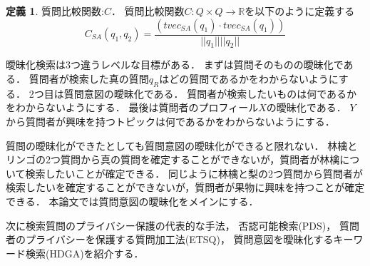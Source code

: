 \documentclass[master]{suribt}
\theoremstyle{definition}
\newtheorem{defi}[thm]{定義}
\begin{document}
 \begin{defi}{質問比較関数:$C$．}
  質問比較関数$C:Q \times Q \rightarrow \mathbb{R}$を以下のように定義する
  \begin{equation}
  C_{SA}(q_1,q_2) = \frac{(tvec_{SA}(q_1) \cdot tvec_{SA}(q_1))}{||q_1|| ||q_2||}
  \end{equation}
 \end{defi}
 
 
 曖昧化検索は3つ違うレベルな目標がある．
 まずは質問そのものの曖昧化である．
 質問者が検索した真の質問$q_R$はどの質問であるかをわからないようにする．
 2つ目は質問意図の曖昧化である．
 質問者が検索したいものは何であるかをわからないようにする．
 最後は質問者のプロフィール$X$の曖昧化である．
 $Y$から質問者が興味を持つトピックは何であるかをわからないようにする．
 
 質問の曖昧化ができたとしても質問意図の曖昧化ができると限れない．
 {林檎}と{リンゴ}の2つ質問から真の質問を確定することができないが，質問者が林檎について検索したいことが確定できる．
 同じように{林檎}と{梨}の2つ質問から質問者が検索したいを確定することができないが，質問者が果物に興味を持つことが確定できる．
 本論文では質問意図の曖昧化をメインにする．

 次に検索質問のプライバシー保護の代表的な手法，
 否認可能検索(PDS)\cite{providing2009}，
 質問者のプライバシーを保護する質問加工法(ETSQ)\cite{embellishing2010}，
 質問意図を曖昧化するキーワード検索(HDGA)\cite{masking2014}を紹介する．
 
\end{document}
